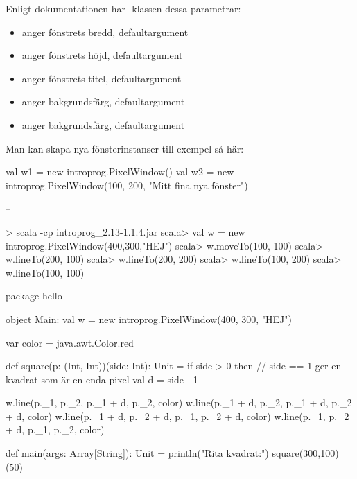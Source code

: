 \SubtaskSolved Enligt dokumentationen har -klassen dessa parametrar:
\begin{itemize}[nolistsep,noitemsep]
  \item {} anger fönstrets bredd, defaultargument 
  \item {} anger fönstrets höjd, defaultargument 
  \item {} anger fönstrets titel, defaultargument 
  \item {} anger bakgrundsfärg, defaultargument 
  \item {} anger bakgrundsfärg, defaultargument 
\end{itemize}
Man kan skapa nya fönsterinstanser till exempel så här:
\begin{Code}
val w1 = new introprog.PixelWindow()
val w2 = new introprog.PixelWindow(100, 200, "Mitt fina nya fönster")
\end{Code}

\SubtaskSolved --

\SubtaskSolved
\begin{REPL}
> scala -cp introprog_2.13-1.1.4.jar
scala> val w = new introprog.PixelWindow(400,300,"HEJ")
scala> w.moveTo(100, 100)
scala> w.lineTo(200, 100)
scala> w.lineTo(200, 200)
scala> w.lineTo(100, 200)
scala> w.lineTo(100, 100)
\end{REPL}

\SubtaskSolved
\begin{Code}
package hello

object Main:
  val w = new introprog.PixelWindow(400, 300, "HEJ")

  var color = java.awt.Color.red

  def square(p: (Int, Int))(side: Int): Unit =
    if side > 0 then
      // side == 1 ger en kvadrat som är en enda pixel
      val d = side - 1  
      
      w.line(p._1,     p._2,     p._1 + d, p._2,     color)
      w.line(p._1 + d, p._2,     p._1 + d, p._2 + d, color)
      w.line(p._1 + d, p._2 + d, p._1,     p._2 + d, color)
      w.line(p._1,     p._2 + d, p._1,     p._2,     color)

  def main(args: Array[String]): Unit =
    println("Rita kvadrat:")
    square(300,100)(50)

\end{Code}


